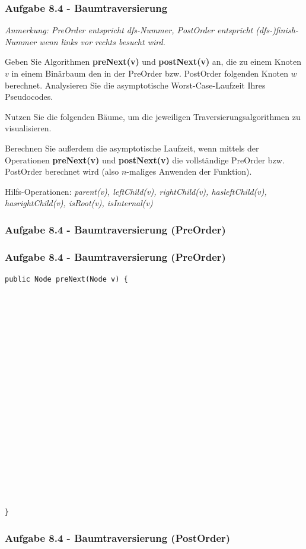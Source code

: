 \documentclass{beamer}
\begin{document}
\begin{frame}
	\frametitle{Aufgabe 8.4 - Baumtraversierung}
	\small
	\textit{Anmerkung: PreOrder entspricht dfs-Nummer, PostOrder entspricht (dfs-)finish-Nummer wenn links vor rechts besucht wird.}

	\bigskip

	Geben Sie Algorithmen \textbf{preNext(v)} und \textbf{postNext(v)} an, die zu einem Knoten $v$ in einem
	Binärbaum den in der PreOrder bzw. PostOrder folgenden Knoten $w$ berechnet. Analysieren
	Sie die asymptotische Worst-Case-Laufzeit Ihres Pseudocodes.

	\medskip

	Nutzen Sie die folgenden Bäume, um die jeweiligen Traversierungsalgorithmen zu visualisieren.

	\medskip

	Berechnen Sie außerdem die asymptotische Laufzeit, wenn mittels der Operationen \textbf{preNext(v)}
	und \textbf{postNext(v)} die vollständige PreOrder bzw. PostOrder berechnet wird (also $n$-maliges
	Anwenden der Funktion).

	\bigskip

	Hilfs-Operationen: \textit{parent(v), leftChild(v), rightChild(v), hasleftChild(v), hasrightChild(v), isRoot(v), isInternal(v)}
\end{frame}

\begin{frame}
	\frametitle{Aufgabe 8.4 - Baumtraversierung (PreOrder)}
	\begin{center}
		
	\end{center}
\end{frame}

\begin{frame}[fragile]
	\frametitle{Aufgabe 8.4 - Baumtraversierung (PreOrder)}
	\scriptsize
	\begin{verbatim}
public Node preNext(Node v) {



















}
	\end{verbatim}
\end{frame}

\begin{frame}
	\frametitle{Aufgabe 8.4 - Baumtraversierung (PostOrder)}
	\begin{center}
		
	\end{center}
\end{frame}
\end{document}
